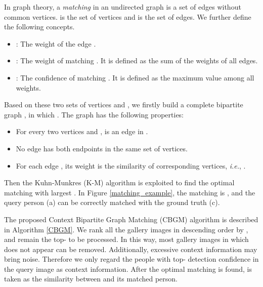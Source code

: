 \documentclass[letterpaper]{article} \usepackage{aaai21}  \usepackage{times}  \usepackage{helvet} \usepackage{courier}  \usepackage[hyphens]{url}  \usepackage{graphicx} \urlstyle{rm} \def\UrlFont{\rm}  \usepackage{natbib}  \usepackage{caption} \usepackage{multirow}
\begin{document}
In graph theory, a \textit{matching}  in an undirected graph is a set of edges without common vertices.  is the set of vertices and  is the set of edges. We further define the following concepts.
\begin{itemize}
    \item : The weight of the edge .
    \item : The weight of matching . It is defined as the sum of the weights of all edges.
    
    \item : The confidence of matching . It is defined as the maximum value among all weights.
    
\end{itemize}

Based on these two sets of vertices  and , we firstly build a complete bipartite graph , in which . The graph has the following properties:
\begin{itemize}
    \item For every two vertices  and ,  is an edge in .
    \item No edge has both endpoints in the same set of vertices.
    \item For each edge , its weight is the similarity of corresponding vertices, \textit{i.e.}, .
\end{itemize}

Then the Kuhn-Munkres (K-M) algorithm \cite{km-k,km-m} is exploited to find the optimal matching with largest . In Figure \ref{matching_example}, the matching is , and the query person (a) can be correctly matched with the ground truth (c).

The proposed Context Bipartite Graph Matching (CBGM) algorithm is described in Algorithm \ref{CBGM}. We rank all the gallery images in descending order by , and remain the top- to be processed. In this way, most gallery images in which  does not appear can be removed. Additionally, excessive context information may bring noise. Therefore we only regard the people with top- detection confidence in the query image as context information. After the optimal matching  is found,  is taken as the similarity between  and its matched person.
\end{document}
